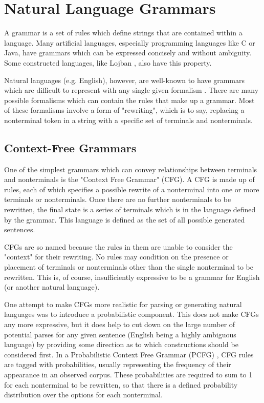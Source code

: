 \section{Natural Language Grammars}

A grammar is a set of rules which define strings that are contained within a language.
Many artificial languages, especially programming languages like C or Java, have
grammars which can be expressed concisely and without ambiguity.  Some
constructed languages, like Lojban \cite{lojban}, also have this property.

Natural languages (e.g. English), however, are well-known to have grammars which are difficult
to represent with any single given formalism \cite{klein2012context}. There are many possible
formalisms which can contain the rules that make up
a grammar.  Most of these formalisms involve a form of "rewriting", which
is to say, replacing a nonterminal token in a string with a specific set of
terminals and nonterminals.

\subsection{Context-Free Grammars}

One of the simplest grammars which can convey relationships between terminals
and nonterminals is the "Context Free Grammar" (CFG).  A CFG is made up of rules,
each of which specifies a possible rewrite of a nonterminal into one or more
terminals or nonterminals.  Once there are no further nonterminals to be rewritten,
the final state is a series of terminals which is in the language defined by the grammar.
This language is defined as the set of all possible generated sentences.

CFGs are so named because the rules in them are unable to consider the "context" for
their rewriting.  No rules may condition on the presence or placement of terminals
or nonterminals other than the single nonterminal to be rewritten.  This is, of course,
insufficiently expressive to be a grammar for English (or another natural language)\cite{jurafsky_textbook}.

One attempt to make CFGs more realistic for parsing or generating natural languages was to
introduce a probabilistic component.  This does not make CFGs any more expressive, but it
does help to cut down on the large number of potential parses for any given sentence
(English being a highly ambiguous language) by providing some direction as to which constructions
should be considered first.  In a Probabilistic Context Free Grammar (PCFG) \cite{pcfg_textbook}, CFG
rules are tagged with probabilities, usually representing the frequency of their appearance in
an observed corpus.  These probabilities are required to sum to 1 for each nonterminal to
be rewritten, so that there is a defined probability distribution over the options for each nonterminal.

